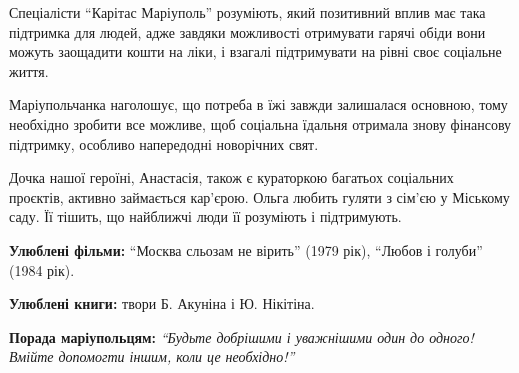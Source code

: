 
Спеціалісти \enquote{Карітас Маріуполь} розуміють, який позитивний вплив має така
підтримка для людей, адже завдяки можливості отримувати гарячі обіди вони
можуть заощадити кошти на ліки, і взагалі підтримувати на рівні своє соціальне
життя.

Маріупольчанка наголошує, що потреба в їжі завжди залишалася основною, тому
необхідно зробити все можливе, щоб соціальна їдальня отримала знову фінансову
підтримку, особливо напередодні новорічних свят.

Дочка нашої героїні, Анастасія, також є кураторкою багатьох соціальних
проєктів, активно займається кар'єрою. Ольга любить гуляти з сім'єю у Міському
саду. Її тішить, що найближчі люди її розуміють і підтримують.

\textbf{Улюблені фільми:} \enquote{Москва сльозам не вірить} (1979 рік), \enquote{Любов і голуби} (1984 рік).

\textbf{Улюблені книги:} твори Б. Акуніна і Ю. Нікітіна.

\textbf{Порада маріупольцям:} \emph{\enquote{Будьте добрішими і уважнішими один до одного! Вмійте допомогти іншим, коли це необхідно!}}
